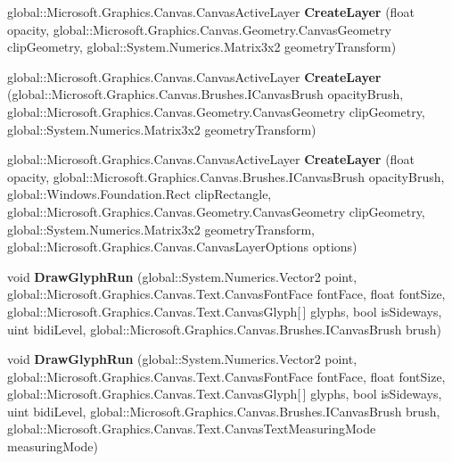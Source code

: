 \begin{DoxyCompactItemize}
global\+::\+Microsoft.\+Graphics.\+Canvas.\+Canvas\+Active\+Layer {\bfseries Create\+Layer} (float opacity, global\+::\+Microsoft.\+Graphics.\+Canvas.\+Geometry.\+Canvas\+Geometry clip\+Geometry, global\+::\+System.\+Numerics.\+Matrix3x2 geometry\+Transform)
\item 
\mbox{\label{class_microsoft_1_1_graphics_1_1_canvas_1_1_canvas_drawing_session_a0246890930306af273c44a895afe6451}} 
global\+::\+Microsoft.\+Graphics.\+Canvas.\+Canvas\+Active\+Layer {\bfseries Create\+Layer} (global\+::\+Microsoft.\+Graphics.\+Canvas.\+Brushes.\+I\+Canvas\+Brush opacity\+Brush, global\+::\+Microsoft.\+Graphics.\+Canvas.\+Geometry.\+Canvas\+Geometry clip\+Geometry, global\+::\+System.\+Numerics.\+Matrix3x2 geometry\+Transform)
\item 
\mbox{\label{class_microsoft_1_1_graphics_1_1_canvas_1_1_canvas_drawing_session_a6062b1492a1896c35d87eca2a7342314}} 
global\+::\+Microsoft.\+Graphics.\+Canvas.\+Canvas\+Active\+Layer {\bfseries Create\+Layer} (float opacity, global\+::\+Microsoft.\+Graphics.\+Canvas.\+Brushes.\+I\+Canvas\+Brush opacity\+Brush, global\+::\+Windows.\+Foundation.\+Rect clip\+Rectangle, global\+::\+Microsoft.\+Graphics.\+Canvas.\+Geometry.\+Canvas\+Geometry clip\+Geometry, global\+::\+System.\+Numerics.\+Matrix3x2 geometry\+Transform, global\+::\+Microsoft.\+Graphics.\+Canvas.\+Canvas\+Layer\+Options options)
\item 
\mbox{\label{class_microsoft_1_1_graphics_1_1_canvas_1_1_canvas_drawing_session_a0fe73a40837cfd7827de146984527959}} 
void {\bfseries Draw\+Glyph\+Run} (global\+::\+System.\+Numerics.\+Vector2 point, global\+::\+Microsoft.\+Graphics.\+Canvas.\+Text.\+Canvas\+Font\+Face font\+Face, float font\+Size, global\+::\+Microsoft.\+Graphics.\+Canvas.\+Text.\+Canvas\+Glyph\mbox{[}$\,$\mbox{]} glyphs, bool is\+Sideways, uint bidi\+Level, global\+::\+Microsoft.\+Graphics.\+Canvas.\+Brushes.\+I\+Canvas\+Brush brush)
\item 
\mbox{\label{class_microsoft_1_1_graphics_1_1_canvas_1_1_canvas_drawing_session_a1f17bbace877bf9a592016a5c88d9f49}} 
void {\bfseries Draw\+Glyph\+Run} (global\+::\+System.\+Numerics.\+Vector2 point, global\+::\+Microsoft.\+Graphics.\+Canvas.\+Text.\+Canvas\+Font\+Face font\+Face, float font\+Size, global\+::\+Microsoft.\+Graphics.\+Canvas.\+Text.\+Canvas\+Glyph\mbox{[}$\,$\mbox{]} glyphs, bool is\+Sideways, uint bidi\+Level, global\+::\+Microsoft.\+Graphics.\+Canvas.\+Brushes.\+I\+Canvas\+Brush brush, global\+::\+Microsoft.\+Graphics.\+Canvas.\+Text.\+Canvas\+Text\+Measuring\+Mode measuring\+Mode)

\end{DoxyCompactItemize}

